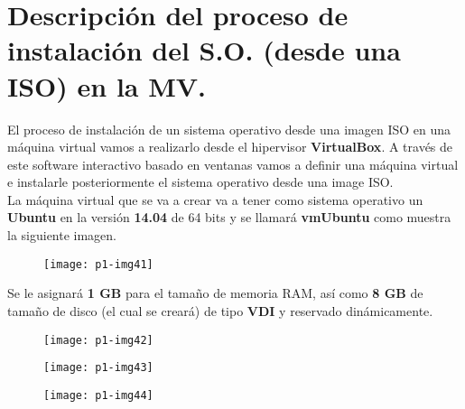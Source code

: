 \documentclass[10pt]{article}
\begin{document}
\section{Descripción del proceso de instalación del S.O. (desde una ISO) en la MV.}
El proceso de instalación de un sistema operativo desde una imagen ISO en una máquina virtual vamos a realizarlo desde el hipervisor \textbf{VirtualBox}. A través de este software interactivo basado en ventanas vamos a definir una máquina virtual e instalarle posteriormente el sistema operativo desde una image ISO. \\

La máquina virtual que se va a crear va a tener como sistema operativo un \textbf{Ubuntu} en la versión \textbf{14.04} de 64 bits y se llamará \textbf{vmUbuntu} como muestra la siguiente imagen. \\

\begin{figure}[H]
	\begin{center}
 		\texttt{[image: p1-img41]}
	\end{center} 
\end{figure}
 
Se le asignará \textbf{1 GB} para el tamaño de memoria RAM, así como \textbf{8 GB} de tamaño de disco (el cual se creará) de tipo \textbf{VDI} y reservado dinámicamente. 

\begin{figure}[H]
	\begin{center}
 		\texttt{[image: p1-img42]}
	\end{center} 
\end{figure}

\begin{figure}[H]
	\begin{center}
 		\texttt{[image: p1-img43]}
	\end{center} 
\end{figure}

\begin{figure}[H]
	\begin{center}
 		\texttt{[image: p1-img44]}
	\end{center} 
\end{figure}
\end{document}
